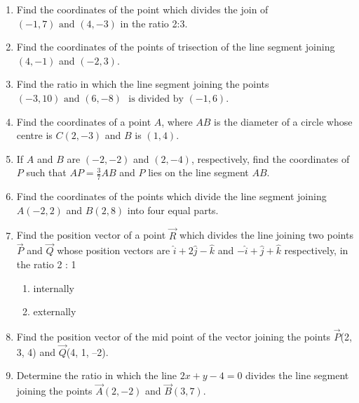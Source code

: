 \begin{enumerate}[label=\thesubsection.\arabic*,ref=\thesubsection.\theenumi]

\item Find the coordinates of the point which divides the join of $(-1,7) \text{ and } (4,-3)$ in the ratio 2:3.
	\\
		\solution
	
\item Find the coordinates of the points of trisection of the line segment joining $(4,-1)$  and  $(-2,3)$.
	\\
		\solution
	
\item Find the ratio in which the line segment joining the points $(-3,10) \text{ and } (6,-8)$ $\text{ is divided by } (-1,6)$.
	\\
		\solution
	
\item Find the coordinates of a point $A$, where $AB$ is the diameter of a circle whose centre is $ C(2,-3)$  and  $B$ is $(1,4)$.
	\\
		\solution
	
\item If $A$ and  $B$ are $(-2,-2)$ and  $(2,-4)$, respectively, find the coordinates of $P$ such that $AP= \frac {3}{7}AB$  and $ P$ lies on the line segment $AB$.
	\\
		\solution
	
\item Find the coordinates of the points which divide the line segment joining $A(-2,2)$  and  $B(2,8)$ into four equal parts.
	\\
		\solution
	
\item Find the position vector of a point $\vec{R}$ which divides the line joining two points $\vec{P}$
and $\vec{Q}$ whose position vectors are $\hat{i}+2\hat{j}-\hat{k}$ and $-\hat{i}+\hat{j}+\hat{k}$ respectively, in the
ratio 2 : 1
\begin{enumerate}
    \item  internally
    \item  externally
\end{enumerate}
\solution
		
\item Find the position vector of the mid point of the vector joining the points $\vec{P}$(2, 3, 4)
and $\vec{Q}$(4, 1, –2).
\\
\solution
		
\item Determine the ratio in which the line $2x+y  - 4=0$ divides the line segment joining the points  $\vec{A}(2, - 2)$  and  $\vec{B}(3, 7)$.

\end{enumerate}
